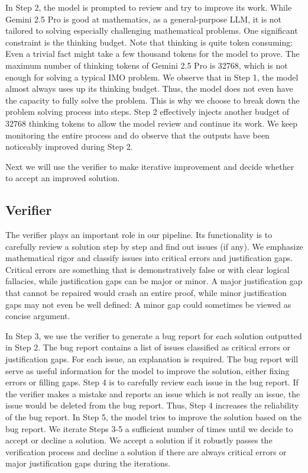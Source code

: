 \documentclass[12pt]{article}
\begin{document}
In Step 2, the model is prompted to review and try to improve its work. While Gemini 2.5 Pro is good at mathematics, as a general-purpose LLM, it is not tailored to solving especially challenging mathematical problems. One significant constraint is the thinking budget. Note that thinking is quite token consuming: Even a trivial fact might take a few thousand tokens for the model to prove. The maximum number of thinking tokens of Gemini 2.5 Pro is 32768, which is not enough for solving a typical IMO problem. We observe that in Step 1, the model almost always uses up its thinking budget. Thus, the model does not even have the capacity to fully solve the problem. This is why we choose to break down the problem solving process into steps. Step 2 effectively injects another budget of 32768 thinking tokens to allow the model review and continue its work. We keep monitoring the entire process and do observe that the outputs have been noticeably improved during Step 2.

Next we will use the verifier to make iterative improvement and decide whether to accept an improved solution.

\subsection{Verifier}

The verifier plays an important role in our pipeline. Its functionality is to carefully review a solution step by step and find out issues (if any). We emphasize mathematical rigor and classify issues into critical errors and justification gaps. Critical errors are something that is demonstratively false or with clear logical fallacies, while justification gaps can be major or minor. A major justification gap that cannot be repaired would crash an entire proof, while minor justification gaps may not even be well defined: A minor gap could sometimes be viewed as concise argument.

In Step 3, we use the verifier to generate a bug report for each solution outputted in Step 2. The bug report contains a list of issues classified as critical errors or justification gaps. For each issue, an explanation is required. The bug report will serve as useful information for the model to improve the solution, either fixing errors or filling gaps. Step 4 is to carefully review each issue in the bug report. If the verifier makes a mistake and reports an issue which is not really an issue, the issue would be deleted from the bug report. Thus, Step 4 increases the reliability of the bug report. In Step 5, the model tries to improve the solution based on the bug report. We iterate Steps 3-5 a sufficient number of times until we decide to accept or decline a solution. We accept a solution if it robustly passes the verification process and decline a solution if there are always critical errors or major justification gaps during the iterations.
\end{document}
